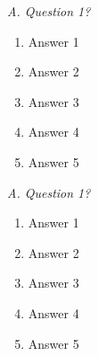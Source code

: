 \begin{multicols}{2}
	\emph{A. Question 1?} 
	\begin{enumerate}
\item Answer 1
\item Answer 2
\item Answer 3
\item Answer 4
\item Answer 5
	\end{enumerate}
	
\emph{A. Question 1?} 
\begin{enumerate}
	\item Answer 1
	\item Answer 2
	\item Answer 3
	\item Answer 4
	\item Answer 5
\end{enumerate}

\end{multicols}